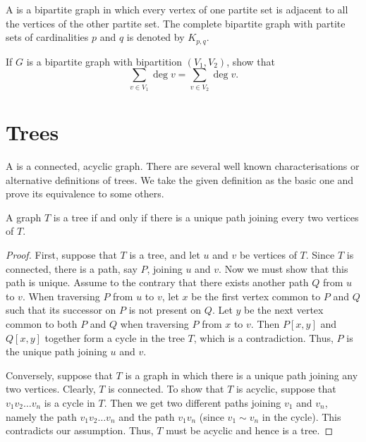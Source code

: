 A  is a bipartite graph in which every vertex of one partite set is adjacent to all the vertices of the other partite set. The complete bipartite graph with partite sets of cardinalities $p$ and $q$ is denoted by $K_{p,q}$.

\begin{Exercise}
If $G$ is a bipartite graph with bipartition $(V_1, V_2)$, show that
\begin{equation*}
\sum_{v \in V_1} \deg v = \sum_{v \in V_2} \deg v.
\end{equation*}
\end{Exercise}


\section{Trees}\label{sec:Trees}

A  is a connected, acyclic graph. There are several well known characterisations or alternative definitions of trees. We take the given definition as the basic one and prove its equivalence to some others.

\begin{Theorem}\label{thm:UniPath}
A graph $T$ is a tree if and only if there is a unique path joining every two vertices of $T$.
\end{Theorem}
\begin{proof}
First, suppose that $T$ is a tree, and let $u$ and $v$ be vertices of $T$. Since $T$ is connected, there is a path, say $P$, joining $u$ and $v$. Now we must show that this path is unique. Assume to the contrary that there exists another path $Q$ from $u$ to $v$. When traversing $P$ from $u$ to $v$, let $x$ be the first vertex common to $P$ and $Q$ such that its successor on $P$ is not present on $Q$. Let $y$ be the next vertex common to both $P$ and $Q$ when traversing $P$ from $x$ to $v$. Then $P[x,y]$ and $Q[x,y]$ together form a cycle in the tree $T$, which is a contradiction. Thus, $P$ is the unique path joining $u$ and $v$.

Conversely, suppose that $T$ is a graph in which there is a unique path joining any two vertices. Clearly, $T$ is connected. To show that $T$ is acyclic, suppose that $v_1 v_2 \ldots v_n$ is a cycle in $T$. Then we get two different paths joining $v_1$ and $v_n$, namely the path $v_1 v_2 \ldots v_n$ and the path $v_1 v_n$ (since $v_1 \sim v_n$ in the cycle). This contradicts our assumption. Thus, $T$ must be acyclic and hence is a tree.
\end{proof}

